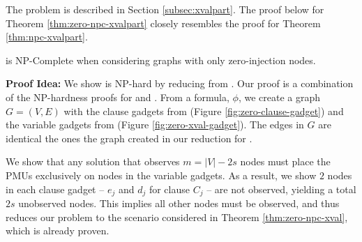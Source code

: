 The \xvalpart problem is described in Section \ref{subsec:xvalpart}.  The proof below for Theorem \ref{thm:zero-npc-xvalpart} closely resembles the proof for Theorem \ref{thm:npc-xvalpart}.

\begin{theorem}
\xvalpart is NP-Complete when considering graphs with only zero-injection nodes.   %
\label{thm:zero-npc-xvalpart}
\end{theorem}


{\bf Proof Idea:} We show \xvalpart is NP-hard by reducing from \sats. Our proof is a combination of the NP-hardness proofs for \maxinc and \xvals. 
From a \sat formula, $\phi$, we create a graph $G=(V,E)$ with the clause gadgets from \maxinc (Figure \ref{fig:zero-clause-gadget}) and the variable gadgets from \xval (Figure \ref{fig:zero-xval-gadget}).
The edges in $G$ are identical the ones the graph created in our reduction for \xvals. 

We show that any solution that observes $m=|V|-2s$ nodes must place the PMUs exclusively on nodes in the variable gadgets. As a result, we show
$2$ nodes in each clause gadget -- $e_j$ and $d_j$ for clause $C_j$ -- are not observed, yielding a total $2s$ unobserved nodes. This implies all other nodes must be 
observed, and thus reduces our problem to the scenario considered in Theorem \ref{thm:zero-npc-xval}, which is already proven.


